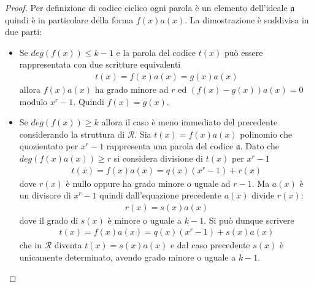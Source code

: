 \begin{proof}
   Per definizione di codice ciclico ogni parola è un elemento dell'ideale $\mathfrak{a}$ quindi è in particolare della forma $f(x)a(x)$. La dimostrazione è suddivisa in due parti: 
   \begin{itemize}
      \item Se $deg(f(x)) \leq k-1$ e la parola del codice $t(x)$ può essere rappresentata con due scritture equivalenti
      \begin{align*}
         t(x) = f(x)a(x) = g(x)a(x)
      \end{align*}
      allora $f(x)a(x)$ ha grado minore ad $r$ ed $(f(x)- g(x))a(x) = 0$ modulo $x^r-1$. Quindi $f(x) = g(x)$. 
      \item Se $deg(f(x)) \geq k$ allora il caso è meno immediato del precedente considerando la struttura di $\mathcal{R}$. Sia $t(x) = f(x)a(x)$ polinomio che quozientato per $x^r-1$ rappresenta una parola del codice $\mathfrak{a}$. Dato che $deg(f(x)a(x))\geq r $ si considera divisione di $t(x)$ per $x^r - 1$ 
      \begin{align*}
      t(x) = f(x)a(x) = q(x)(x^r - 1) + r(x)
      \end{align*}
      dove $r(x)$ è nullo oppure ha grado minore o uguale ad $r-1$. Ma $a(x)$ è un divisore di $x^r-1$ quindi dall'equazione precedente $a(x)$ divide $r(x)$:
      \begin{align*}
         r(x) = s(x)a(x)
      \end{align*}
      dove il grado di $s(x)$ è minore o uguale a $k-1$. Si può dunque scrivere
      \begin{align*}
      t(x) = f(x)a(x) = q(x)(x^r - 1) + s(x)a(x)
      \end{align*}
      che in $\mathcal{R}$ diventa $t(x) = s(x)a(x)$ e dal caso precedente $s(x)$ è unicamente determinato, avendo grado minore o uguale a $k-1$.
   \end{itemize}
\end{proof}

